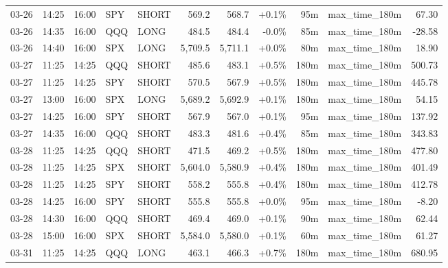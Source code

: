 \documentclass[11pt,a4paper,twoside]{article}
\begin{document}
\begin{center}
\begin{longtable}{>{\color{txtmain}}l l l l l r r r r >{\color{txtmain}}l r}
03-26 & 14:25 & 16:00 & SPY & SHORT & 569.2 & 568.7 & \textcolor{wingreen}{+0.1\%} & 95m & max\_time\_180m & \textcolor{wingreen}{67.30} \\
03-26 & 14:35 & 16:00 & QQQ & LONG & 484.5 & 484.4 & \textcolor{lossred}{-0.0\%} & 85m & max\_time\_180m & \textcolor{lossred}{-28.58} \\
03-26 & 14:40 & 16:00 & SPX & LONG & 5,709.5 & 5,711.1 & \textcolor{wingreen}{+0.0\%} & 80m & max\_time\_180m & \textcolor{wingreen}{18.90} \\
03-27 & 11:25 & 14:25 & QQQ & SHORT & 485.6 & 483.1 & \textcolor{wingreen}{+0.5\%} & 180m & max\_time\_180m & \textcolor{wingreen}{500.73} \\
03-27 & 11:25 & 14:25 & SPY & SHORT & 570.5 & 567.9 & \textcolor{wingreen}{+0.5\%} & 180m & max\_time\_180m & \textcolor{wingreen}{445.78} \\
03-27 & 13:00 & 16:00 & SPX & LONG & 5,689.2 & 5,692.9 & \textcolor{wingreen}{+0.1\%} & 180m & max\_time\_180m & \textcolor{wingreen}{54.15} \\
03-27 & 14:25 & 16:00 & SPY & SHORT & 567.9 & 567.0 & \textcolor{wingreen}{+0.1\%} & 95m & max\_time\_180m & \textcolor{wingreen}{137.92} \\
03-27 & 14:35 & 16:00 & QQQ & SHORT & 483.3 & 481.6 & \textcolor{wingreen}{+0.4\%} & 85m & max\_time\_180m & \textcolor{wingreen}{343.83} \\
03-28 & 11:25 & 14:25 & QQQ & SHORT & 471.5 & 469.2 & \textcolor{wingreen}{+0.5\%} & 180m & max\_time\_180m & \textcolor{wingreen}{477.80} \\
03-28 & 11:25 & 14:25 & SPX & SHORT & 5,604.0 & 5,580.9 & \textcolor{wingreen}{+0.4\%} & 180m & max\_time\_180m & \textcolor{wingreen}{401.49} \\
03-28 & 11:25 & 14:25 & SPY & SHORT & 558.2 & 555.8 & \textcolor{wingreen}{+0.4\%} & 180m & max\_time\_180m & \textcolor{wingreen}{412.78} \\
03-28 & 14:25 & 16:00 & SPY & SHORT & 555.8 & 555.8 & \textcolor{wingreen}{+0.0\%} & 95m & max\_time\_180m & \textcolor{lossred}{-8.20} \\
03-28 & 14:30 & 16:00 & QQQ & SHORT & 469.4 & 469.0 & \textcolor{wingreen}{+0.1\%} & 90m & max\_time\_180m & \textcolor{wingreen}{62.44} \\
03-28 & 15:00 & 16:00 & SPX & SHORT & 5,584.0 & 5,580.0 & \textcolor{wingreen}{+0.1\%} & 60m & max\_time\_180m & \textcolor{wingreen}{61.27} \\
03-31 & 11:25 & 14:25 & QQQ & LONG & 463.1 & 466.3 & \textcolor{wingreen}{+0.7\%} & 180m & max\_time\_180m & \textcolor{wingreen}{680.95} \\

\end{longtable}
\end{center}
\end{document}
